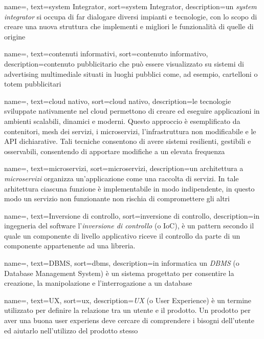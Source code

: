 {
    name=,
    text=system Integrator,
    sort=system Integrator,
    description={un \emph{system integrator} si occupa di far dialogare diversi impianti e tecnologie, con lo scopo di creare una nuova struttura che implementi e migliori le funzionalità di quelle di origine}
}

{
    name=,
    text=contenuti informativi,
    sort=contenuto informativo,
    description={contenuto pubblicitario che può essere visualizzato su sistemi di advertising multimediale situati in luoghi pubblici come, ad esempio, cartelloni o totem pubblicitari}
}

{
    name=,
    text=cloud nativo,
    sort=cloud nativo,
    description={le tecnologie sviluppate nativamente nel cloud permettono di creare ed eseguire applicazioni in ambienti scalabili, dinamici e moderni. Questo approccio è esemplificato da contenitori, mesh dei servizi, i microservizi, l'infrastruttura non modificabile e le API dichiarative. Tali tecniche consentono di avere sistemi resilienti, gestibili e osservabili, consentendo di apportare modifiche a un elevata frequenza}
}

{
    name=,
    text=microservizi,
    sort=microservizi,
    description={un architettura a \emph{microservizi} organizza un'applicazione come una raccolta di servizi. In tale arhitettura ciascuna funzione è implementabile in modo indipendente, in questo modo un servizio non funzionante non rischia di compromettere gli altri}
}

{
    name=,
    text=Inversione di controllo,
    sort=inversione di controllo,
    description={in ingegneria del software l'\emph{inversione di controllo} (o IoC), è un pattern secondo il quale un componente di livello applicativo riceve il controllo da parte di un componente appartenente ad una libreria.}
}

{
    name=,
    text=DBMS,
    sort=dbms,
    description={in informatica un \emph{DBMS} (o Database Management System) è un sistema progettato per consentire la creazione, la manipolazione e l'interrogazione a un database}
}

{
    name=,
    text=UX,
    sort=ux,
    description={\emph{UX} (o User Experience) è un termine utilizzato per definire la relazione tra un utente e il prodotto. Un prodotto per aver una buona user experiens deve cercare di comprendere i bisogni dell'utente ed aiutarlo nell'utilizzo del prodotto stesso}
}

